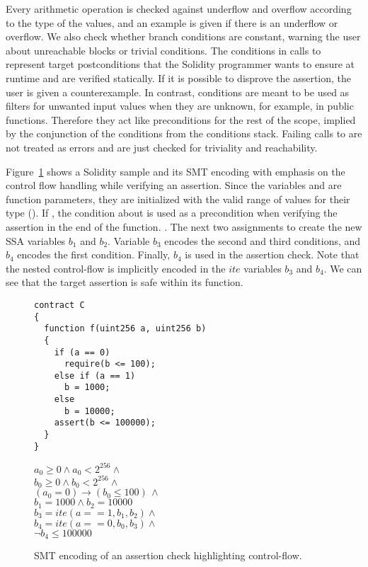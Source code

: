 Every arithmetic operation is checked against underflow and overflow according
to the type of the values, and an example is given if there is an underflow or
overflow.
%
We also check whether branch conditions are constant, warning the user about
unreachable blocks or trivial conditions.
%
The conditions in calls to  represent target postconditions that the
Solidity programmer wants to ensure at runtime and are verified statically.
%
If it is possible to disprove the assertion, the user is given a
counterexample.
%
In contrast,  conditions are meant to be used as
filters for unwanted input values when they are unknown, for example, in public
functions.
%
Therefore they act like preconditions for the rest of the scope, implied by the
conjunction of the conditions from the conditions stack.
%
Failing calls to  are not treated as errors and
are just checked for triviality and reachability.
%

Figure~\ref{figure:solidity_encoding_1} shows a Solidity sample and its SMT
encoding with emphasis on the control flow handling while verifying an assertion.
%
Since the variables  and  are function parameters, they
are initialized with the valid range of values for their type ().
%
If , the  condition about  is used as a
precondition when verifying the assertion in the end of the function.
.
%
The next two assignments to  create the new SSA variables
$b_1$ and $b_2$.
%
Variable $b_3$ encodes the second and third conditions, and $b_4$
encodes the first condition.
%
Finally, $b_4$ is used in the assertion check.
%
Note that the nested control-flow is implicitly encoded in the $ite$
variables $b_3$ and $b_4$.
%
We can see that the target assertion is safe within its function.

\begin{figure}
\label{figure:solidity_encoding_1}
\noindent\begin{minipage}{.48\textwidth}
\begin{verbatim}
contract C
{
  function f(uint256 a, uint256 b)
  {
    if (a == 0)
      require(b <= 100);
    else if (a == 1)
      b = 1000;
    else
      b = 10000;
    assert(b <= 100000);
  }
}
\end{verbatim}
\end{minipage}\hfill
\begin{minipage}{.48\textwidth}
$a_0 \ge 0 \land a_0 < 2^{256}  \land \phantom{x}$\\
$b_0 \ge 0 \land b_0 < 2^{256}  \land \phantom{x}$\\
$(a_0 = 0) \rightarrow (b_0 \le 100) \, \land$\\
$b_1 = 1000 \land b_2 = 10000$\\
$b_3 = ite(a == 1, b_1, b_2) \land \phantom{x}$\\
$b_4 = ite(a == 0, b_0, b_3) \land \phantom{x}$\\
$\neg b_4 \le 100000$
\end{minipage}
\caption{SMT encoding of an assertion check highlighting control-flow.}
\end{figure}

